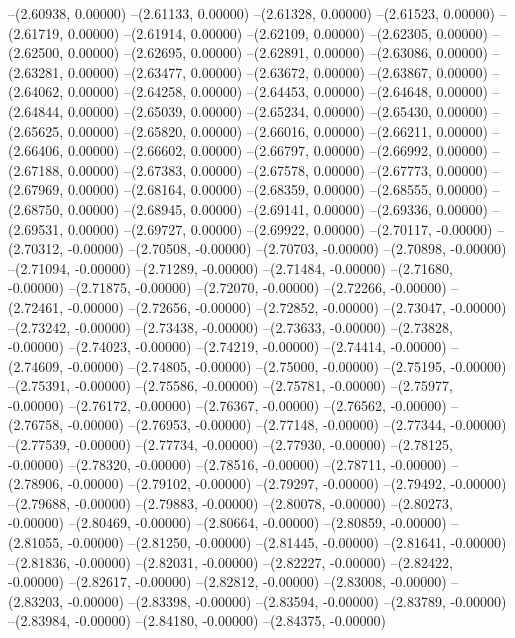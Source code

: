 --(2.60938, 0.00000)
--(2.61133, 0.00000)
--(2.61328, 0.00000)
--(2.61523, 0.00000)
--(2.61719, 0.00000)
--(2.61914, 0.00000)
--(2.62109, 0.00000)
--(2.62305, 0.00000)
--(2.62500, 0.00000)
--(2.62695, 0.00000)
--(2.62891, 0.00000)
--(2.63086, 0.00000)
--(2.63281, 0.00000)
--(2.63477, 0.00000)
--(2.63672, 0.00000)
--(2.63867, 0.00000)
--(2.64062, 0.00000)
--(2.64258, 0.00000)
--(2.64453, 0.00000)
--(2.64648, 0.00000)
--(2.64844, 0.00000)
--(2.65039, 0.00000)
--(2.65234, 0.00000)
--(2.65430, 0.00000)
--(2.65625, 0.00000)
--(2.65820, 0.00000)
--(2.66016, 0.00000)
--(2.66211, 0.00000)
--(2.66406, 0.00000)
--(2.66602, 0.00000)
--(2.66797, 0.00000)
--(2.66992, 0.00000)
--(2.67188, 0.00000)
--(2.67383, 0.00000)
--(2.67578, 0.00000)
--(2.67773, 0.00000)
--(2.67969, 0.00000)
--(2.68164, 0.00000)
--(2.68359, 0.00000)
--(2.68555, 0.00000)
--(2.68750, 0.00000)
--(2.68945, 0.00000)
--(2.69141, 0.00000)
--(2.69336, 0.00000)
--(2.69531, 0.00000)
--(2.69727, 0.00000)
--(2.69922, 0.00000)
--(2.70117, -0.00000)
--(2.70312, -0.00000)
--(2.70508, -0.00000)
--(2.70703, -0.00000)
--(2.70898, -0.00000)
--(2.71094, -0.00000)
--(2.71289, -0.00000)
--(2.71484, -0.00000)
--(2.71680, -0.00000)
--(2.71875, -0.00000)
--(2.72070, -0.00000)
--(2.72266, -0.00000)
--(2.72461, -0.00000)
--(2.72656, -0.00000)
--(2.72852, -0.00000)
--(2.73047, -0.00000)
--(2.73242, -0.00000)
--(2.73438, -0.00000)
--(2.73633, -0.00000)
--(2.73828, -0.00000)
--(2.74023, -0.00000)
--(2.74219, -0.00000)
--(2.74414, -0.00000)
--(2.74609, -0.00000)
--(2.74805, -0.00000)
--(2.75000, -0.00000)
--(2.75195, -0.00000)
--(2.75391, -0.00000)
--(2.75586, -0.00000)
--(2.75781, -0.00000)
--(2.75977, -0.00000)
--(2.76172, -0.00000)
--(2.76367, -0.00000)
--(2.76562, -0.00000)
--(2.76758, -0.00000)
--(2.76953, -0.00000)
--(2.77148, -0.00000)
--(2.77344, -0.00000)
--(2.77539, -0.00000)
--(2.77734, -0.00000)
--(2.77930, -0.00000)
--(2.78125, -0.00000)
--(2.78320, -0.00000)
--(2.78516, -0.00000)
--(2.78711, -0.00000)
--(2.78906, -0.00000)
--(2.79102, -0.00000)
--(2.79297, -0.00000)
--(2.79492, -0.00000)
--(2.79688, -0.00000)
--(2.79883, -0.00000)
--(2.80078, -0.00000)
--(2.80273, -0.00000)
--(2.80469, -0.00000)
--(2.80664, -0.00000)
--(2.80859, -0.00000)
--(2.81055, -0.00000)
--(2.81250, -0.00000)
--(2.81445, -0.00000)
--(2.81641, -0.00000)
--(2.81836, -0.00000)
--(2.82031, -0.00000)
--(2.82227, -0.00000)
--(2.82422, -0.00000)
--(2.82617, -0.00000)
--(2.82812, -0.00000)
--(2.83008, -0.00000)
--(2.83203, -0.00000)
--(2.83398, -0.00000)
--(2.83594, -0.00000)
--(2.83789, -0.00000)
--(2.83984, -0.00000)
--(2.84180, -0.00000)
--(2.84375, -0.00000)
